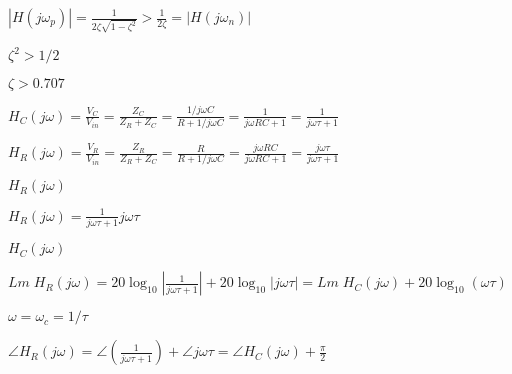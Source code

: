 \documentclass{article}
\def\lthtmlcheckvsize{\ifdim\ht\sizebox<\vsize 
  \ifdim\wd\sizebox<\hsize\expandafter\hfill\fi \expandafter\vfill
  \else\expandafter\vss\fi}%
\begin{document}
{\newpage\clearpage
{}%
$\displaystyle | H(j\omega_p) |=\frac{1}{2\zeta\sqrt{1-\zeta^2}} > \frac{1}{2\zeta}=| H(j\omega_n) |$%
\lthtmlindisplaymathZ
\lthtmlcheckvsize\clearpage}

{\newpage\clearpage
{}%
$ \zeta^2>1/2$%
\lthtmlindisplaymathZ
\lthtmlcheckvsize\clearpage}

{\newpage\clearpage
{}%
$ \zeta>0.707$%
\lthtmlindisplaymathZ
\lthtmlcheckvsize\clearpage}

{\newpage\clearpage
{}%
$\displaystyle H_C(j\omega)=\frac{V_C}{V_{in}}=\frac{Z_C}{Z_R+Z_C}
=\frac{1/j\omega C}{R+1/j\omega C}
=\frac{1}{j\omega RC+1}=\frac{1}{j\omega \tau+1}$%
\lthtmlindisplaymathZ
\lthtmlcheckvsize\clearpage}

{\newpage\clearpage
{}%
$\displaystyle H_R(j\omega)=\frac{V_R}{V_{in}}=\frac{Z_R}{Z_R+Z_C}
=\frac{R}{R+1/j\omega C}=\frac{j\omega RC}{j\omega RC+1}
=\frac{j\omega \tau}{j\omega \tau+1}$%
\lthtmlindisplaymathZ
\lthtmlcheckvsize\clearpage}

{\newpage\clearpage
{}%
$ H_R(j\omega)$%
\lthtmlindisplaymathZ
\lthtmlcheckvsize\clearpage}

{\newpage\clearpage
{}%
$\displaystyle H_R(j\omega)= \frac{1}{j\omega \tau+1} j\omega \tau$%
\lthtmlindisplaymathZ
\lthtmlcheckvsize\clearpage}

{\newpage\clearpage
{}%
$ H_C(j\omega)$%
\lthtmlindisplaymathZ
\lthtmlcheckvsize\clearpage}

{\newpage\clearpage
{}%
$\displaystyle Lm\;H_R(j\omega)
=20\log_{10} \left| \frac{1}{j\omega \tau+1}\right|+20\log_{10} \left| j\omega \tau \right|
=Lm\; H_C(j\omega) +20\log_{10} (\omega\tau)$%
\lthtmlindisplaymathZ
\lthtmlcheckvsize\clearpage}

{\newpage\clearpage
{}%
$ \omega=\omega_c=1/\tau$%
\lthtmlindisplaymathZ
\lthtmlcheckvsize\clearpage}

{\newpage\clearpage
{}%
$\displaystyle \angle H_R(j\omega)=\angle \left(\frac{1}{j\omega \tau+1}\right)+\angle j\omega \tau
=\angle H_C(j\omega)+\frac{\pi}{2}$%
\lthtmlindisplaymathZ
\lthtmlcheckvsize\clearpage}
\end{document}
